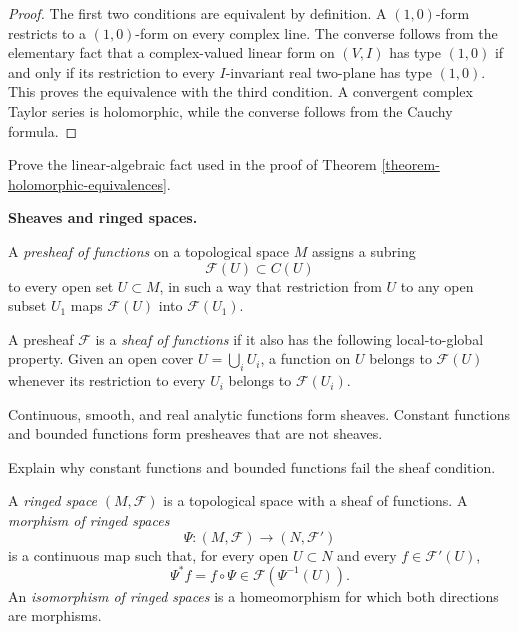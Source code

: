 \begin{proof}
The first two conditions are equivalent by
definition. A $(1,0)$-form restricts to a
$(1,0)$-form on every complex line. The
converse follows from the elementary fact
that a complex-valued linear form on
$(V,I)$ has type $(1,0)$ if and only if its
restriction to every $I$-invariant real
two-plane has type $(1,0)$. This proves the
equivalence with the third condition. A
convergent complex Taylor series is
holomorphic, while the converse follows
from the Cauchy formula.
\end{proof}

\begin{exercise}
\label{exercise-line-restrictions}
Prove the linear-algebraic fact used in the
proof of Theorem
\ref{theorem-holomorphic-equivalences}.
\end{exercise}

{\bf Sheaves and ringed spaces.}

\begin{definition}
\label{definition-presheaf-functions}
A {\it presheaf of functions} on a
topological space $M$ assigns a subring
$$
\mathcal{F}(U)\subset C(U)
$$
to every open set $U\subset M$, in such a
way that restriction from $U$ to any open
subset $U_1$ maps $\mathcal{F}(U)$ into
$\mathcal{F}(U_1)$.
\end{definition}

\begin{definition}
\label{definition-sheaf-functions}
A presheaf $\mathcal{F}$ is a
{\it sheaf of functions} if it also has the
following local-to-global property. Given
an open cover $U=\bigcup_iU_i$, a function
on $U$ belongs to $\mathcal{F}(U)$ whenever
its restriction to every $U_i$ belongs to
$\mathcal{F}(U_i)$.
\end{definition}

Continuous, smooth, and real analytic
functions form sheaves. Constant functions
and bounded functions form presheaves that
are not sheaves.

\begin{exercise}
\label{exercise-presheaves-not-sheaves}
Explain why constant functions and bounded
functions fail the sheaf condition.
\end{exercise}

\begin{definition}
\label{definition-ringed-space-course}
A {\it ringed space} $(M,\mathcal{F})$ is a
topological space with a sheaf of functions.
A {\it morphism of ringed spaces}
$$
\Psi:(M,\mathcal{F})
\longrightarrow(N,\mathcal{F}')
$$
is a continuous map such that, for every
open $U\subset N$ and every
$f\in\mathcal{F}'(U)$,
$$
\Psi^*f=f\circ\Psi
\in\mathcal{F}(\Psi^{-1}(U)).
$$
An {\it isomorphism of ringed spaces} is a
homeomorphism for which both directions are
morphisms.
\end{definition}

